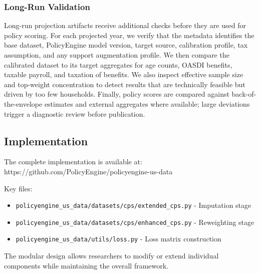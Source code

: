 \subsubsection{Long-Run Validation}

Long-run projection artifacts receive additional checks before they are used for policy scoring. For each projected year, we verify that the metadata identifies the base dataset, PolicyEngine model version, target source, calibration profile, tax assumption, and any support augmentation profile. We then compare the calibrated dataset to its target aggregates for age counts, OASDI benefits, taxable payroll, and taxation of benefits. We also inspect effective sample size and top-weight concentration to detect results that are technically feasible but driven by too few households. Finally, policy scores are compared against back-of-the-envelope estimates and external aggregates where available; large deviations trigger a diagnostic review before publication.

\subsection{Implementation}

The complete implementation is available at:
https://github.com/PolicyEngine/policyengine-us-data

Key files:
\begin{itemize}
\item \texttt{policyengine\_us\_data/datasets/cps/extended\_cps.py} - Imputation stage
\item \texttt{policyengine\_us\_data/datasets/cps/enhanced\_cps.py} - Reweighting stage
\item \texttt{policyengine\_us\_data/utils/loss.py} - Loss matrix construction
\end{itemize}

The modular design allows researchers to modify or extend individual components while maintaining the overall framework.

